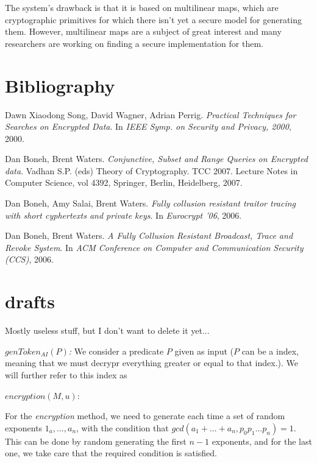 \documentclass[a4paper, 12pt, oneside]{article}
\begin{document}
The system's drawback is that it is based on multilinear maps, which are cryptographic primitives for which there isn't yet a secure model for generating them. However, multilinear maps are a subject of great interest and many researchers are working on finding a secure implementation for them.


\newpage
\section{Bibliography}
\begin{thebibliography}{9}

Dawn Xiaodong Song, David Wagner, Adrian Perrig.
\textit{Practical Techniques for Searches on Encrypted Data}. In
\textit{IEEE Symp. on Security and Privacy, 2000}, 2000.


Dan Boneh, Brent Waters. 
\textit{Conjunctive, Subset and Range Queries on Encrypted data}.
Vadhan S.P. (eds) Theory of Cryptography. TCC 2007. Lecture Notes in Computer Science, vol 4392, Springer, Berlin, Heidelberg, 2007.
 

Dan Boneh, Amy Salai, Brent Waters. 
\textit{Fully collusion resistant traitor tracing with short cyphertexts and private keys}. In
\textit{Eurocrypt '06}, 2006.
  
  
Dan Boneh, Brent Waters. 
\textit{A Fully Collusion Resistant Broadcast, Trace and Revoke System}. In
\textit{ACM Conference on Computer and Communication Security
(CCS)}, 2006.

  
 
  
 \end{thebibliography}
 
\newpage
\section*{drafts}
 Mostly useless stuff, but I don't want to delete it yet...


\textit{$genToken_{AI}(P)$:} We consider a predicate $P$ given as input ($P$ can be a index, meaning that we must decrypr everything greater or equal to that index.). We will further refer to this index as 

\bigskip

\bigskip
$encryption(M, u)$:

{\color{red}
For the \textit{encryption} method, we need to generate each time a set of random exponents $1_a, ..., a_n$, with the condition that $gcd(a_1+...+a_n, p_0p_1...p_n) = 1$. This can be done by random generating the first $n - 1$ exponents, and for the last one, we take care that the required condition is satisfied.
}
\end{document}
